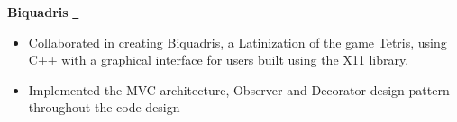 \textbf{Biquadris} \href{https://gitfront.io/r/ininicho/7d297ade9beb8e6f7355bade7d31ac436faee7a2/biquadris/}{\github\ } \par
\begin{itemize}
	\item Collaborated in creating Biquadris, a Latinization of the game Tetris, using C++ with a
		graphical interface for users built using the X11 library.
	\item Implemented the MVC architecture, Observer and Decorator design pattern throughout the code design
\end{itemize}
\vspace{0.1cm} \par

